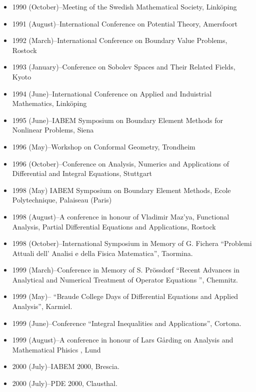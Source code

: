 \documentclass{article}
\begin{document}
\begin{itemize}
         \item 1990 (October)--Meeting of the Swedish Mathematical 
Society, Link\"oping
         \item 1991 (August)--International Conference on Potential 
Theory, Amersfoort

         \item 1992 (March)--International Conference on Boundary 
Value Problems, Rostock
          \item 1993 (January)--Conference on Sobolev Spaces and Their 
Related Fields, Kyoto
         \item 1994 (June)--International Conference on Applied and 
Induistrial Mathematics, Link\"oping
         \item 1995 (June)--IABEM Symposium on Boundary Element 
Methods for Nonlinear Problems, Siena
          \item 1996 (May)--Workshop on Conformal Geometry, Trondheim
         \item 1996 (October)--Conference on Analysis, Numerics and 
Applications of Differential and Integral Equations, Stuttgart
         \item 1998 (May) IABEM Symposium on Boundary Element Methods, Ecole
           Polytechnique, Palaiseau (Paris)
         \item 1998 (August)--A conference in honour of Vladimir Maz'ya,
           Functional Analysis, Partial Differential Equations and
           Applications, Rostock
         \item 1998 (October)--International Symposium in Memory of G. 
Fichera ``Problemi Attuali dell' Analisi e della Fisica
               Matematica'', Taormina.
         \item 1999 (March)--Conference in Memory of S. Pr\"ossdorf 
``Recent Advances in Analytical and Numerical Treatment of
               Operator Equations '', Chemnitz.
         \item 1999 (May)-- ``Braude College Days of Differential 
Equations and Applied Analysis'', Karmiel.
         \item 1999 (June)--Conference ``Integral Inequalities and 
Applications'', Cortona.
         \item 1999 (August)--A conference in honour of Lars 
G{\aa}rding on Analysis and Mathematical Phisics , Lund
         \item 2000 (July)--IABEM 2000, Brescia.
         \item 2000 (July)--PDE 2000, Clausthal.

\end{itemize}
\end{document}
